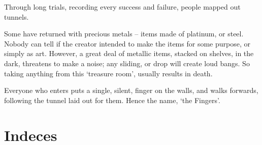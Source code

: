 \begin{multicols}{2}
Through long trials, recording every success and failure, people mapped out tunnels.

Some have returned with precious metals -- items made of platinum, or steel.
Nobody can tell if the creator intended to make the items for some purpose, or simply as art.
However, a great deal of metallic items, stacked on shelves, in the dark, threatens to make a noise; any sliding, or drop will create loud bangs.
So taking anything from this `treasure room', usually results in death.

Everyone who enters puts a single, silent, finger on the walls, and walks forwards, following the tunnel laid out for them.
Hence the name, `the Fingers'.

\end{multicols}

\chapter{Indeces}


\printindex[history]

\printindex[talismans]

\printindex

